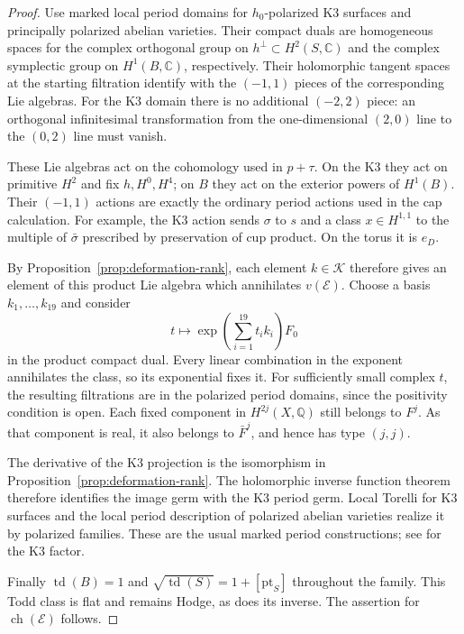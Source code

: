 \documentclass[11pt]{article}
\numberwithin{equation}{section}
\theoremstyle{definition}
\theoremstyle{remark}
\begin{document}
\begin{proof}
Use marked local period domains for $h_0$-polarized K3 surfaces
and principally polarized abelian varieties. Their compact duals
are homogeneous spaces for the complex orthogonal group on
$h^\perp\subset H^2(S,\mathbb C)$ and the complex symplectic group on
$H^1(B,\mathbb C)$, respectively. Their holomorphic tangent spaces at the
starting filtration identify with the $(-1,1)$ pieces of the
corresponding Lie algebras. For the K3 domain there is no additional
$(-2,2)$ piece: an orthogonal infinitesimal transformation from the
one-dimensional $(2,0)$ line to the $(0,2)$ line must vanish.

These Lie algebras act on the cohomology used in $p+\tau$. On the
K3 they act on primitive $H^2$ and fix $h,H^0,H^4$; on $B$ they
act on the exterior powers of $H^1(B)$. Their $(-1,1)$ actions
are exactly the ordinary period actions used in the cap calculation.
For example, the K3 action sends $\sigma$ to $s$ and a class
$x\in H^{1,1}$ to the multiple of $\bar\sigma$ prescribed by
preservation of cup product. On the torus it is $e_D$.

By Proposition~\ref{prop:deformation-rank}, each element $k\in \mathcal K$
therefore gives an element of this product Lie algebra which
annihilates $v(\mathcal E)$. Choose a basis $k_1,\ldots,k_{19}$
and consider
\[
 t\longmapsto
 \exp\left(\sum_{i=1}^{19}t_i k_i\right)F_0
\]
in the product compact dual. Every linear combination in the
exponent annihilates the class, so its exponential fixes it.
For sufficiently small complex $t$, the resulting filtrations are
in the polarized period domains, since the positivity condition
is open. Each fixed component in $H^{2j}(X,\mathbb Q)$ still belongs to
$F^j$. As that component is real, it also belongs to $\bar F^j$,
and hence has type $(j,j)$.

The derivative of the K3 projection is the isomorphism in
Proposition~\ref{prop:deformation-rank}. The holomorphic inverse
function theorem therefore identifies the image germ with the
K3 period germ. Local Torelli for K3 surfaces and the local period
description of polarized abelian varieties realize it by polarized
families. These are the usual marked period constructions; see
\cite[Chapter~6]{Huybrechts} for the K3 factor.

Finally $\operatorname{td}(B)=1$ and
$\sqrt{\operatorname{td}(S)}=1+[\mathrm{pt}_S]$ throughout the family. This
Todd class is flat and remains Hodge, as does its inverse. The
assertion for $\operatorname{ch}(\mathcal E)$ follows.
\end{proof}
\end{document}
